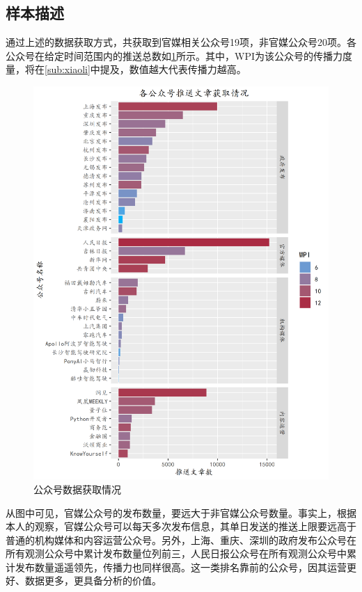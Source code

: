 \documentclass[a4paper,12pt,UTF8]{article}
\begin{document}
    \subsection{样本描述}
    通过上述的数据获取方式，共获取到官媒相关公众号19项，非官媒公众号20项。各公众号在给定时间范围内的推送总数如\cref{fig:profiles}所示。其中，WPI为该公众号的传播力度量，将在\cref{sub:xiaoli}中提及，数值越大代表传播力越高。
    \begin{figure}[htbp]
      \centering
      \includegraphics[width=1\linewidth]{profiles.png}
      \caption{公众号数据获取情况}
      \label{fig:profiles}
    \end{figure}
    
    从图中可见，官媒公众号的发布数量，要远大于非官媒公众号数量。事实上，根据本人的观察，官媒公众号可以每天多次发布信息，其单日发送的推送上限要远高于普通的机构媒体和内容运营公众号。另外，上海、重庆、深圳的政府发布公众号在所有观测公众号中累计发布数量位列前三，人民日报公众号在所有观测公众号中累计发布数量遥遥领先，传播力也同样很高。这一类排名靠前的公众号，因其运营更好、数据更多，更具备分析的价值。
\end{document}
